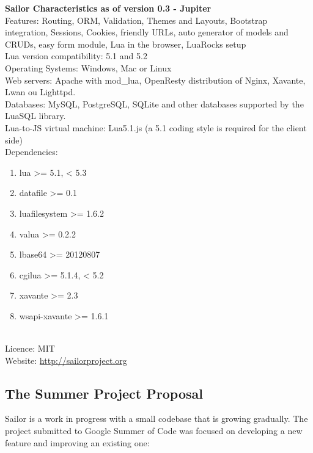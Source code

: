\documentclass{article}
\begin{document}
\textbf{Sailor Characteristics as of version 0.3 - Jupiter}\\

Features: Routing, ORM, Validation, Themes and Layouts, Bootstrap integration, Sessions, Cookies, friendly URLs, auto generator of models and CRUDs, easy form module, Lua in the browser, LuaRocks setup\\

Lua version compatibility: 5.1 and 5.2\\

Operating Systems: Windows, Mac or Linux\\

Web servers: Apache with mod\_lua, OpenResty distribution of Nginx, Xavante, Lwan ou Lighttpd.\\

Databases: MySQL, PostgreSQL, SQLite and other databases supported by the LuaSQL library.\\

Lua-to-JS virtual machine: Lua5.1.js (a 5.1 coding style is required for the client side)\\

Dependencies:
\begin{enumerate}\item lua >= 5.1, < 5.3
\item datafile >= 0.1
\item luafilesystem >= 1.6.2
\item valua >= 0.2.2
\item lbase64 >= 20120807
\item cgilua >= 5.1.4, < 5.2
\item xavante >= 2.3
\item wsapi-xavante >= 1.6.1 
\end{enumerate}\\

Licence: MIT\\

Website: \url{http://sailorproject.org}\\

\subsection{The Summer Project Proposal}

Sailor is a work in progress with a small codebase that is growing gradually. The project submitted to Google Summer of Code was focused on developing a new feature and improving an existing one: \\
\end{document}
